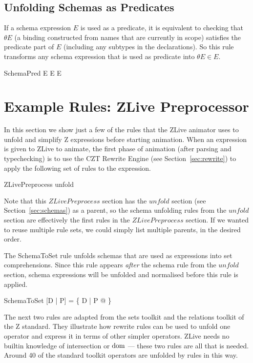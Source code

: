 \documentclass{entcs}
\begin{document}
\subsection{Unfolding Schemas as Predicates}

If a schema expression $E$ is used as a predicate, it is equivalent to
checking that $\theta E$ (a binding constructed from names that are
currently in scope) satisfies the predicate part of $E$ (including any
subtypes in the declarations).  So this rule transforms any schema
expression that is used as predicate into $\theta E \in E$.
\begin{zedrule}{SchemaPred}
  E \iff \theta E \in E
\end{zedrule}

\section{Example Rules: ZLive Preprocessor} \label{sec:zlive}

In this section we show just a few of the rules that the ZLive
animator uses to unfold and simplify Z expressions before starting
animation.  When an expression is given to ZLive to animate, the first
phase of animation (after parsing and typechecking) is to use the CZT
Rewrite Engine (see Section~\ref{sec:rewrite}) to apply the following
set of rules to the expression.

\begin{zsection}
  \SECTION ZLivePreprocess \parents unfold
\end{zsection}

Note that this $ZLivePreprocess$ section has the $unfold$ section (see
Section~\ref{sec:schemas}) as a parent, so the schema unfolding rules
from the $unfold$ section are effectively the first rules in the
$ZLivePreprocess$ section.  If we wanted to reuse multiple rule sets,
we could simply list multiple parents, in the desired order.

The SchemaToSet rule unfolds schemas that are used as expressions into
set comprehensions.  Since this rule appears \emph{after} the schema
rule from the $unfold$ section, schema expressions will be unfolded
and normalised before this rule is applied.
\begin{zedrule}{SchemaToSet}
[D | P] = \{ D | P @ \theta [D | true] \}
\end{zedrule}

The next two rules are adapted from the sets toolkit and the relations
toolkit of the Z standard.  They illustrate how rewrite rules can be
used to unfold one operator and express it in terms of other simpler
operators.  ZLive needs no builtin knowledge of intersection or $\mathop{\mathstrut{\mbox{\textrm{dom}}}}\nolimits$
--- these two rules are all that is needed.  Around 40 of the standard
toolkit operators are unfolded by rules in this way.
\end{document}

